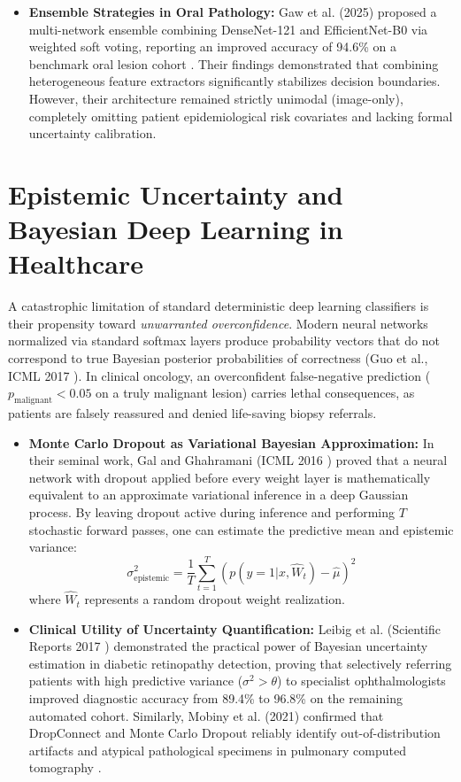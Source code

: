 \documentclass[12pt,a4paper,oneside]{report}
\begin{document}
\begin{itemize}
    \item \textbf{Ensemble Strategies in Oral Pathology:} Gaw et al. (2025) proposed a multi-network ensemble combining DenseNet-121 and EfficientNet-B0 via weighted soft voting, reporting an improved accuracy of 94.6\% on a benchmark oral lesion cohort \cite{gaw2025optimized}. Their findings demonstrated that combining heterogeneous feature extractors significantly stabilizes decision boundaries. However, their architecture remained strictly unimodal (image-only), completely omitting patient epidemiological risk covariates and lacking formal uncertainty calibration.
\end{itemize}

\section{Epistemic Uncertainty and Bayesian Deep Learning in Healthcare}
\label{sec:uncertainty_lit}

A catastrophic limitation of standard deterministic deep learning classifiers is their propensity toward \textit{unwarranted overconfidence}. Modern neural networks normalized via standard softmax layers produce probability vectors that do not correspond to true Bayesian posterior probabilities of correctness (Guo et al., ICML 2017 \cite{guo2017calibration}). In clinical oncology, an overconfident false-negative prediction ($p_{\text{malignant}} < 0.05$ on a truly malignant lesion) carries lethal consequences, as patients are falsely reassured and denied life-saving biopsy referrals.

\begin{itemize}
    \item \textbf{Monte Carlo Dropout as Variational Bayesian Approximation:} In their seminal work, Gal and Ghahramani (ICML 2016 \cite{gal2016dropout}) proved that a neural network with dropout applied before every weight layer is mathematically equivalent to an approximate variational inference in a deep Gaussian process. By leaving dropout active during inference and performing $T$ stochastic forward passes, one can estimate the predictive mean and epistemic variance:
    \begin{equation}
        \sigma^2_{\text{epistemic}} = \frac{1}{T} \sum_{t=1}^{T} \left( p(y=1 | x, \hat{W}_t) - \hat{\mu} \right)^2
    \end{equation}
    where $\hat{W}_t$ represents a random dropout weight realization.
    
    \item \textbf{Clinical Utility of Uncertainty Quantification:} Leibig et al. (Scientific Reports 2017 \cite{leibig2017leveraging}) demonstrated the practical power of Bayesian uncertainty estimation in diabetic retinopathy detection, proving that selectively referring patients with high predictive variance ($\sigma^2 > \theta$) to specialist ophthalmologists improved diagnostic accuracy from 89.4\% to 96.8\% on the remaining automated cohort. Similarly, Mobiny et al. (2021) confirmed that DropConnect and Monte Carlo Dropout reliably identify out-of-distribution artifacts and atypical pathological specimens in pulmonary computed tomography \cite{mobiny2021dropconnect}.
\end{itemize}
\end{document}
